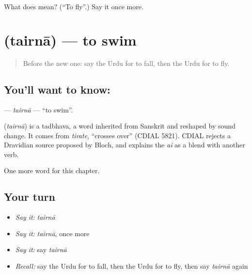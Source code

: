 \begin{tcolorbox}[breakable,colback=teal!4,colframe=teal!35!black,title={Before you move on}]
What does  mean? (\textquotedblleft{}To fly\textquotedblright{}.) Say it once more.
\end{tcolorbox}
\section[\texorpdfstring{\ur{تیرنا} (tairnā)}{تیرنا (tairnā)}]{ (tairnā) — to swim}

\label{lesson:UR-C138-tairna}



\begin{quote}
Before the new one: say the Urdu for to fall, then the Urdu for to fly.
\end{quote}

\subsection*{You'll want to know: }
\textbf{} — \emph{tairnā} — \textquotedblleft{}to swim\textquotedblright{}.

\begin{cousinweb}
\textbf{} (\emph{tairnā}) is a tadbhava, a word inherited from Sanskrit and reshaped by sound change. It comes from \emph{tirate}, \textquotedblleft{}crosses over\textquotedblright{} (CDIAL 5821). CDIAL rejects a Dravidian source proposed by Bloch, and explains the \emph{ai} as a blend with another verb.
\end{cousinweb}

\begin{grammarlens}[title={What you've built}]
One more word for this chapter.
\end{grammarlens}

\subsection*{Your turn}
\begin{itemize}
\raggedright
  \item \emph{Say it:} \emph{tairnā}
  \item \emph{Say it:} \emph{tairnā}, once more
  \item \emph{Say it:} say \emph{tairnā}
  \item \emph{Recall:} say the Urdu for to fall, then the Urdu for to fly, then say \emph{tairnā} again
\end{itemize}


